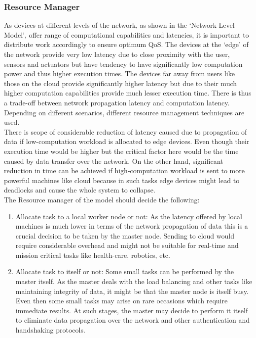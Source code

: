 \documentclass[10pt,journal,compsoc]{IEEEtran}
\begin{document}
\subsubsection{Resource Manager}
As devices at different levels of the network, as shown in the ‘Network Level Model’, offer range of computational capabilities and latencies, it is important to distribute work accordingly to ensure optimum QoS. The devices at the ‘edge’ of the network provide very low latency due to close proximity with the user, sensors and actuators but have tendency to have significantly low computation power and thus higher execution times. The devices far away from users like those on the cloud provide significantly higher latency but due to their much higher computation capabilities provide much lesser execution time. There is thus a trade-off between network propagation latency and computation latency. Depending on different scenarios, different resource management techniques are used.\\
There is scope of considerable reduction of latency caused due to propagation of data if low-computation workload is allocated to edge devices. Even though their execution time would be higher but the critical factor here would be the time caused by data transfer over the network. On the other hand, significant reduction in time can be achieved if high-computation workload is sent to more powerful machines like cloud because in such tasks edge devices might lead to deadlocks and cause the whole system to collapse. \\
The Resource manager of the model should decide the following:
\begin{enumerate}
\item Allocate task to a local worker node or not: As the latency offered by local machines is much lower in terms of the network propagation of data this is a crucial decision to be taken by the master node. Sending to cloud would require considerable overhead and might not be suitable for real-time and mission critical tasks like health-care, robotics, etc. 
\item Allocate task to itself or not: Some small tasks can be performed by the master itself. As the master deals with the load balancing and other tasks like maintaining integrity of data, it might be that the master node is itself busy. Even then some small tasks may arise on rare occasions which require immediate results. At such stages, the master may decide to perform it itself to eliminate data propagation over the network and other authentication and handshaking protocols.
\end{enumerate}
\end{document}
